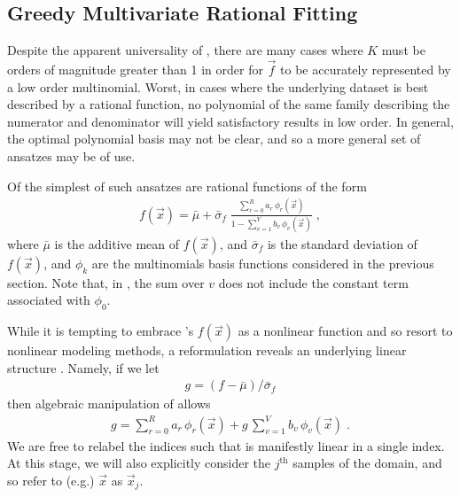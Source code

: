\documentclass[twocolumn,aps,prd,floatfix,preprintnumbers,a4paper,nofootinbib,
superscriptaddress,10pt]{revtex4-1}
\begin{document}
\subsection{Greedy Multivariate Rational Fitting}
%
%
\par Despite the apparent universality of , there are many cases where $K$ must be orders of magnitude greater than 1 in order for $\vec{f}$ to be accurately represented by a low order multinomial.
%
Worst, in cases where the underlying dataset is best described by a rational function, no polynomial of the same family describing the numerator and denominator will yield satisfactory results in low order.
%
In general, the optimal polynomial basis may not be clear, and so a more general set of ansatzes may be of use.
%
\par Of the simplest of such ansatzes are rational functions of the form
%
\def\muf{\bar{\mu}}
\def\sif{\bar{\sigma}_f}
\begin{align}
  \label{eq:rat1}
  f(\vec{x}) = \muf + \sif \; \frac{ \sum_{r=0}^{R} a_r \, \phi_{r}(\vec{x}) }{ 1 - \sum_{v=1}^{V} b_v \, \phi_{v}(\vec{x}) } \;,
\end{align}
%
where $\muf$ is the additive mean of $f(\vec{x})$, and $\sif$ is the standard deviation of $f(\vec{x})$, and $\phi_k$ are the multinomials basis functions considered in the previous section.
%
Note that, in , the sum over $v$ does not include the constant term associated with $\phi_0$.
%
\par While it is tempting to embrace 's $f({\vec{x}})$ as a nonlinear function and so resort to nonlinear modeling methods, a reformulation reveals an underlying linear structure \cite{Press:1992:NRC:148286}.
%
Namely, if we let
%
\begin{align}
  g = (f - \muf)/\sif
\end{align}
%
then algebraic manipulation of  allows
%
\begin{align}
  \label{eq:rat2}
  g = \sum_{r=0}^{R} a_r \, \phi_{r}(\vec{x}) + g\, \sum_{v=1}^{V} b_v \, \phi_{v}(\vec{x}) \; .
\end{align}
%
We are free to relabel the indices such that  is manifestly linear in a single index.
%
At this stage, we will also explicitly consider the $j^\mathrm{th}$ samples of the domain, and so refer to (e.g.) $\vec{x}$ as $\vec{x}_j$.
%
%
\end{document}
